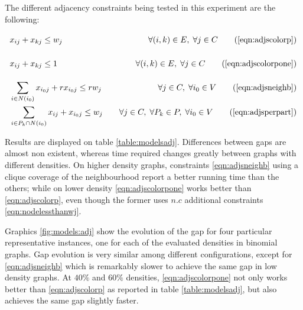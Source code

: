 The different adjacency constraints being tested in this experiment are the following: 

\begin{align*}
&x_{ij} + x_{kj} \leq w_j \sumheight &\quad \forall (i,k) \in E, \; \forall j \in C \tag{\ref{eqn:adjscolorp}} \\
&x_{ij} + x_{kj} \leq 1 \sumheight &\quad \forall (i,k) \in E, \; \forall j \in C \tag{\ref{eqn:adjscolorpone}} \\
&\sum_{i \in N(i_0)} x_{i_0j} + r x_{i_0j} \leq r w_j &\quad \forall j \in C, \; \forall i_0 \in V \tag{\ref{eqn:adjsneighb}} \\
&\sum_{i \in P_k \cap N(i_0)} x_{ij} + x_{i_0j} \leq w_j &\quad \forall j \in C, \; \forall P_k \in P, \; \forall i_0 \in V \tag{\ref{eqn:adjsperpart}} 
\end{align*}

Results are displayed on table \ref{table:modelsadj}. Differences between gaps are almost non existent, whereas time required changes greatly between graphs with different densities. On higher density graphs, constraints \ref{eqn:adjsneighb} using a clique coverage of the neighbourhood report a better running time than the others; while on lower density \ref{eqn:adjscolorpone} works better than \ref{eqn:adjscolorp}, even though the former uses $n.c$ additional constraints \ref{eqn:nodelessthanwj}.

Graphics \ref{fig:models:adj} show the evolution of the gap for four particular representative instances, one for each of the evaluated densities in binomial graphs. Gap evolution is very similar among different configurations, except for \ref{eqn:adjsneighb} which is remarkably slower to achieve the same gap in low density graphs. At $40\%$ and $60\%$ densities, \ref{eqn:adjscolorpone} not only works better than \ref{eqn:adjscolorp} as reported in table \ref{table:modelsadj}, but also achieves the same gap slightly faster.


